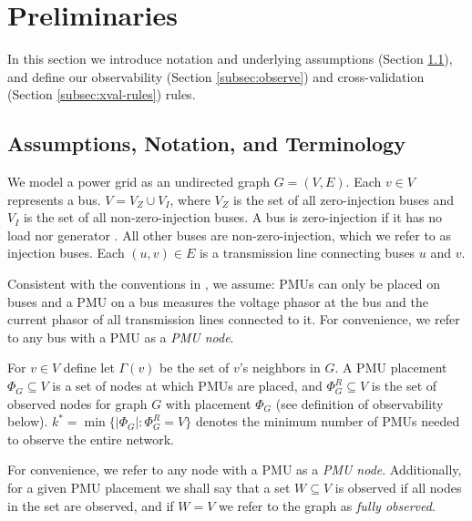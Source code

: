 \section{Preliminaries}
\label{sec:prelim}

In this section we introduce notation and underlying assumptions (Section \ref{subsec:notation-assume}), 
and define our observability (Section \ref{subsec:observe}) and cross-validation (Section \ref{subsec:xval-rules}) rules.


\subsection{Assumptions, Notation, and Terminology}
\label{subsec:notation-assume}

We model a power grid as an undirected graph $G=(V,E)$.  Each $v \in V$ represents a bus. %
$V=V_Z \cup V_I$, where $V_Z$ is the set of all zero-injection buses and $V_I$ is the set of all non-zero-injection buses.  A bus is zero-injection if it has no load nor generator \cite{Zhang10}.
All other buses are non-zero-injection, which we refer to as injection buses.
Each $(u,v) \in E$ is a transmission line connecting buses $u$ and $v$. 

Consistent with the conventions in \cite{Baldwin93,Brueni05,Abur06,Mili90,Xu04,Xu05}, we assume: PMUs can only be placed on buses and a PMU on a bus measures 
the voltage phasor at the bus and the current phasor of all transmission lines connected to it. For convenience, we refer to any bus with a PMU as a \emph{PMU node}. 

For  $v\in V$ define let $\Gamma(v)$ be the set of $v$'s neighbors in $G$.
A PMU placement $\Phi_G \subseteq V$ is a set of nodes at which PMUs are placed,
and $\Phi^R_G\subseteq V$ is the set of observed nodes for graph $G$ with placement $\Phi_G$ (see definition of observability below).
$k^* = \min \{|\Phi_G|:\Phi^R_G=V\}$ denotes the minimum number of PMUs needed to observe the entire network. %

For convenience, we refer to any node with a PMU as a \emph{PMU node}. Additionally, for a given PMU placement we shall say that a set $W\subseteq V$ is observed if all nodes in the set are observed, and if $W=V$ we refer to the graph as \emph{fully observed}. 

